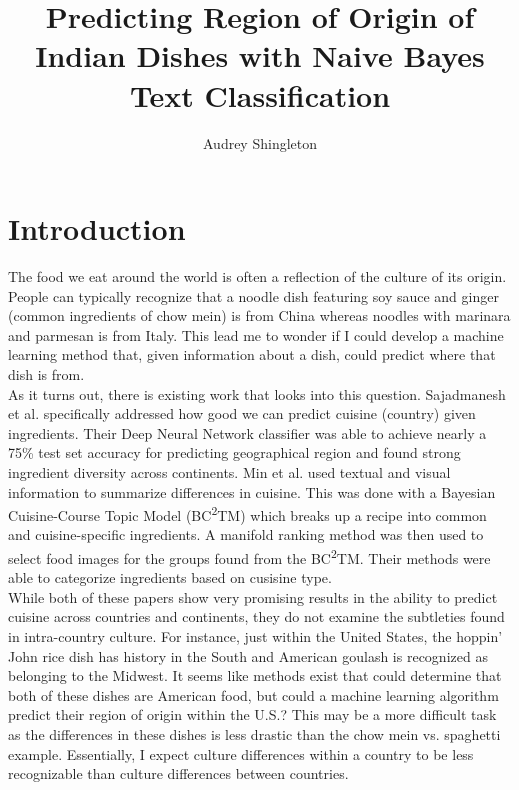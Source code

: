 \documentclass[12pt]{article}
\title{Predicting Region of Origin of Indian Dishes with Naive Bayes Text Classification}
\author{Audrey Shingleton}
\begin{document}
\maketitle

\section{Introduction}
The food we eat around the world is often a reflection of the culture of its origin. People can typically recognize that a noodle dish featuring soy sauce and ginger (common ingredients of chow mein) is from China whereas noodles with marinara and parmesan is from Italy. This lead me to wonder if I could develop a machine learning method that, given information about a dish, could predict where that dish is from.\\ 


\noindent As it turns out, there is existing work that looks into this question. Sajadmanesh et al.\cite{Sajadmanesh} specifically addressed how good we can predict cuisine (country) given ingredients. Their Deep Neural Network classifier was able to achieve nearly a 75\% test set accuracy for predicting geographical region and found strong ingredient diversity across continents.
Min et al.\cite{Min} used textual and visual information to summarize differences in cuisine. This was done with a Bayesian Cuisine-Course Topic Model (BC\textsuperscript{2}TM) which breaks up a recipe into common and cuisine-specific ingredients. A manifold ranking method was then used to select food images for the groups found from the BC\textsuperscript{2}TM. Their methods were able to categorize ingredients based on cusisine type. \\

\noindent While both of these papers show very promising results in the ability to predict cuisine across countries and continents, they do not examine the subtleties found in intra-country culture. For instance, just within the United States, the hoppin' John rice dish has history in the South and American goulash is recognized as belonging to the Midwest.
It seems like methods exist that could determine that both of these dishes are American food, but could a machine learning algorithm predict their region of origin within the U.S.? This may be a more difficult task as the differences in these dishes is less drastic than the chow mein vs. spaghetti example. Essentially, I expect culture differences within a country to be less recognizable than culture differences between countries.\\
\end{document}
